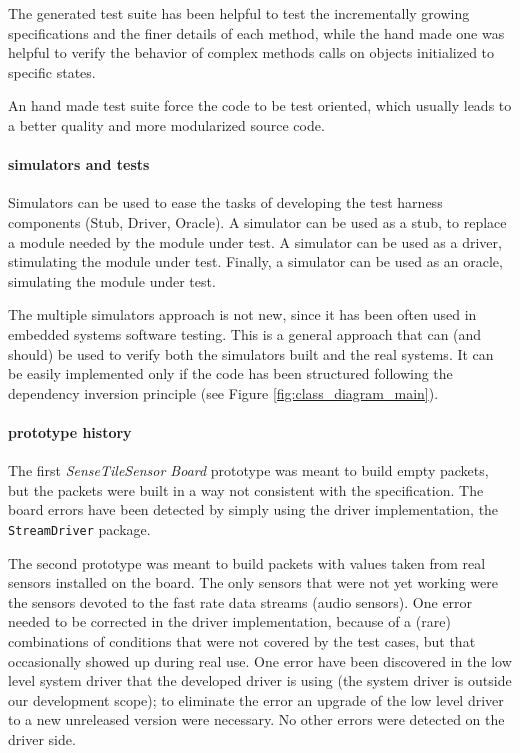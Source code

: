 \documentclass{article}
\newcommand{\lil}[1]{\texttt{\lstinline|#1|}}
\newcommand{\ST}{\emph{SenseTile}\xspace}
\newcommand{\SB}{\emph{Sensor Board}\xspace}
\newcommand{\STSB}{\ST \SB\xspace}
\begin{document}
The generated test suite has been helpful to test the incrementally growing specifications and the finer details of each method, while the hand made one was helpful to verify the behavior of complex methods calls on objects initialized to specific states. 

An hand made test suite force the code to be test oriented, which usually leads to a better quality and more modularized source code\cite{Binder1999}.

\paragraph*{simulators and tests}

Simulators can be used to ease the tasks of developing the test harness components (Stub, Driver, Oracle).
A simulator can be used as a stub, to replace a module needed by the module under test.
A simulator can be used as a driver, stimulating the module under test.
Finally, a simulator can be used as an oracle, simulating the module under test.

The multiple simulators approach is not new, since it has been often used in embedded systems software testing\cite{Broekman2002}.  
This is a general approach that can (and should) be used to verify both the simulators built and the real systems.  
It can be easily implemented only if the code has been structured following the dependency inversion principle\cite{Martin1996} (see Figure
\ref{fig:class_diagram_main}).

\paragraph*{prototype history}

The first \STSB prototype was meant to build empty packets, but the packets were built in a way not consistent with the specification.  
The board errors have been detected by simply using the driver implementation, the \lil{StreamDriver} package.

The second prototype was meant to build packets with values taken from real sensors installed on the board.  
The only sensors that were not yet working were the sensors devoted to the fast rate data streams (audio sensors).  
One error needed to be corrected in the driver implementation, because of a (rare) combinations of conditions that were not covered by the test cases, but that occasionally showed up during real use.
One error have been discovered in the low level system driver that the developed driver is using (the system driver is outside our development scope); to eliminate the error an upgrade of the low level driver to a new unreleased version were necessary. 
No other errors were detected on the driver side.
\end{document}
